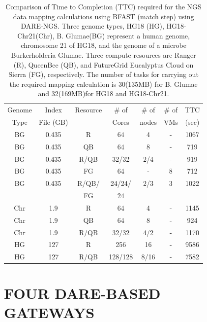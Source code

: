 \documentclass{sig-alternate}
\begin{document}
 \begin{table}
\scriptsize
 \begin{tabular}{|c|c|c|c|c|c|c|} 
 \hline 
Genome & Index         & Resource    & \# of & \# of &   \# of         &	TTC  \\
  Type               & File (GB)        & &Cores &   nodes &  VMs&  (sec)\\  
  \hline
 BG &0.435& R&	64 &4&-	&1067 \\
\hline                  
BG &0.435& QB	&	64& 8&-	&719 \\
\hline
 BG &0.435&R/QB	&	32/32 &2/4& -&919 \\
\hline
 BG &0.435& FG &	64 &-&8	&712 \\
\hline
 BG &0.435 &  R/QB/ &	24/24/& 2/3 & 3 &1022\\
 & & FG& 24 &&&\\
\hline
\hline
Chr &1.9& R	&	64& 4 &-&1145 \\
\hline
Chr &1.9& QB	&	64&8&-	&924 \\
\hline
Chr &1.9& R/QB	&	32/32& 4/2&	-&1170 \\
\hline
\hline
HG &127& R	&	256 & 16 &-	&9586\\
\hline
HG &127& R/QB	&	128/128&8/16 & -&7582 \\
\hline
\end{tabular}
\caption{
  Comparison of Time to Completion (TTC) required for the NGS data
  mapping calculations using BFAST (match step) using DARE-NGS.  
  Three genome types,
  HG18 (HG), HG18-Chr21(Chr), B. Glumae(BG) represent a human genome,
  chromosome 21 of HG18, and the genome of a microbe Burkerholderia
  Glumae.  Three compute resources are Ranger (R), QueenBee (QB), and
  FutureGrid  Eucalyptus Cloud on Sierra (FG), respectively.  The
  number of tasks for carrying out the required mapping calculation is
  30(135MB) for B. Glumae and 32(169MB)for HG18 and HG18-Chr21.
}

  \label{table:NGS-Distributed} 
\end{table}




\section{FOUR DARE-BASED GATEWAYS}
\end{document}
